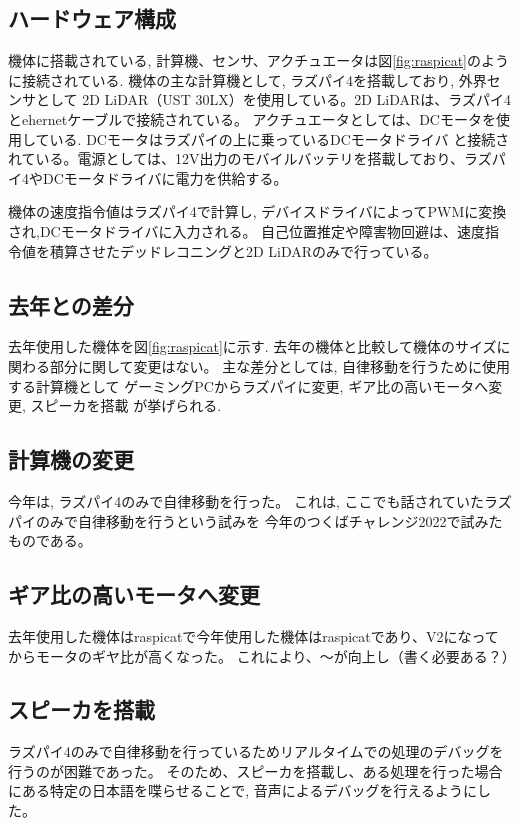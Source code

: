 \documentclass[twocolumn,9pt]{jsproceedings}
\begin{document}
\subsection{ハードウェア構成}

機体に搭載されている, 計算機、センサ、アクチュエータは図\ref{fig:raspicat}のように接続されている.
機体の主な計算機として, ラズパイ4を搭載しており, 外界センサとして
2D LiDAR（UST 30LX）を使用している。2D LiDARは、ラズパイ4とehernetケーブルで接続されている。
アクチュエータとしては、DCモータを使用している. DCモータはラズパイの上に乗っているDCモータドライバ
と接続されている。電源としては、12V出力のモバイルバッテリを搭載しており、ラズパイ4やDCモータドライバに電力を供給する。

機体の速度指令値はラズパイ4で計算し, デバイスドライバによってPWMに変換され,DCモータドライバに入力される。
自己位置推定や障害物回避は、速度指令値を積算させたデッドレコニングと2D LiDARのみで行っている。

\subsection{去年との差分}
 
去年使用した機体を図\ref{fig:raspicat}に示す. 
去年の機体と比較して機体のサイズに関わる部分に関して変更はない。
主な差分としては, 自律移動を行うために使用する計算機として
ゲーミングPCからラズパイに変更, ギア比の高いモータへ変更, スピーカを搭載
が挙げられる.


\subsection{計算機の変更}

今年は, ラズパイ4のみで自律移動を行った。
これは, ここでも話されていたラズパイのみで自律移動を行うという試みを
今年のつくばチャレンジ2022で試みたものである。

\subsection{ギア比の高いモータへ変更}

去年使用した機体はraspicatで今年使用した機体はraspicatであり、V2になってからモータのギヤ比が高くなった。
これにより、〜が向上し（書く必要ある？）

\subsection{スピーカを搭載}

ラズパイ4のみで自律移動を行っているためリアルタイムでの処理のデバッグを行うのが困難であった。
そのため、スピーカを搭載し、ある処理を行った場合にある特定の日本語を喋らせることで, 
音声によるデバッグを行えるようにした。
\end{document}
